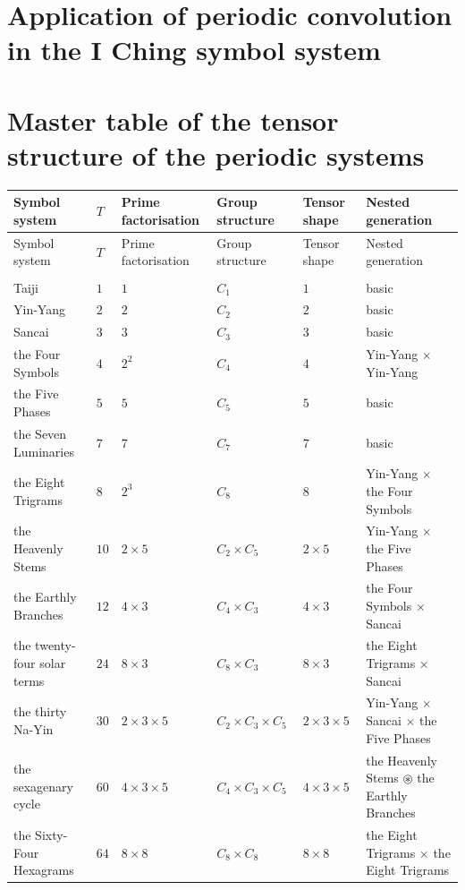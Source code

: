 \endgroup

\section{Application of periodic convolution in the I Ching symbol system}

\section{Master table of the tensor structure of the periodic systems}

\begingroup
\setlength{\tabcolsep}{4pt}
\begin{longtable}{>{\raggedright\arraybackslash}p{2.7cm}>{\centering\arraybackslash}p{0.6cm}>{\centering\arraybackslash}p{2.6cm}>{\centering\arraybackslash}p{2.8cm}>{\centering\arraybackslash}p{2.3cm}>{\raggedright\arraybackslash}p{2.8cm}}
\toprule
Symbol system & $T$ & Prime factorisation & Group structure & Tensor shape & Nested generation \\
\midrule
\endfirsthead
\toprule
Symbol system & $T$ & Prime factorisation & Group structure & Tensor shape & Nested generation \\
\midrule
\endhead
\midrule
\multicolumn{6}{r}{\small(continued on the next page)} \\
\endfoot
\bottomrule
\endlastfoot
Taiji & $1$ & $1$ & $C_1$ & $1$ & basic \\
Yin-Yang & $2$ & $2$ & $C_2$ & $2$ & basic \\
Sancai & $3$ & $3$ & $C_3$ & $3$ & basic \\
the Four Symbols & $4$ & $2^2$ & $C_4$ & $4$ & Yin-Yang $\times$ Yin-Yang \\
the Five Phases & $5$ & $5$ & $C_5$ & $5$ & basic \\
the Seven Luminaries & $7$ & $7$ & $C_7$ & $7$ & basic \\
the Eight Trigrams & $8$ & $2^3$ & $C_8$ & $8$ & Yin-Yang $\times$ the Four Symbols \\
the Heavenly Stems & $10$ & $2 \times 5$ & $C_2 \times C_5$ & $2 \times 5$ & Yin-Yang $\times$ the Five Phases \\
the Earthly Branches & $12$ & $4 \times 3$ & $C_4 \times C_3$ & $4 \times 3$ & the Four Symbols $\times$ Sancai \\
the twenty-four solar terms & $24$ & $8 \times 3$ & $C_8 \times C_3$ & $8 \times 3$ & the Eight Trigrams $\times$ Sancai \\
the thirty Na-Yin & $30$ & $2 \times 3 \times 5$ & $C_2 \times C_3 \times C_5$ & $2 \times 3 \times 5$ & Yin-Yang $\times$ Sancai $\times$ the Five Phases \\
the sexagenary cycle & $60$ & $4 \times 3 \times 5$ & $C_4 \times C_3 \times C_5$ & $4 \times 3 \times 5$ & the Heavenly Stems $\circledast$ the Earthly Branches \\
the Sixty-Four Hexagrams & $64$ & $8 \times 8$ & $C_8 \times C_8$ & $8 \times 8$ & the Eight Trigrams $\times$ the Eight Trigrams \\
\end{longtable}
\endgroup

